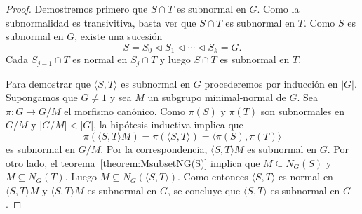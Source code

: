 \begin{proof}
	Demostremos primero que $S\cap T$ es subnormal en $G$. Como la
	subnormalidad es transivitiva, basta ver que $S\cap T$ es subnormal en $T$.
	Como $S$ es subnormal en $G$, existe una sucesión 
	\[
		S=S_0\triangleleft S_1\triangleleft \cdots\triangleleft S_k=G.
	\]
	Cada $S_{j-1}\cap T$ es normal en $S_j\cap T$ y luego $S\cap T$ es
	subnormal en $T$.
	
	
	Para demostrar que $\langle S,T\rangle$ es subnormal en $G$ 
	procederemos por inducción en $|G|$. Supongamos que $G\ne1$ y sea $M$ un
	subgrupo minimal-normal de $G$. Sea $\pi\colon G\to G/M$ el morfismo
	canónico. Como $\pi(S)$ y $\pi(T)$ son subnormales en $G/M$ y $|G/M|<|G|$,
	la hipótesis inductiva implica que 
	\[
	\pi(\langle S,T\rangle M)=\pi(\langle S,T\rangle)=\langle \pi(S),\pi(T)\rangle
	\]
	es subnormal en $G/M$. Por la correspondencia, $\langle S,T\rangle M$ es
	subnormal en $G$. Por otro lado, el teorema~\ref{theorem:MsubsetNG(S)}
	implica que $M\subseteq N_G(S)$ y $M\subseteq N_G(T)$. Luego $M\subseteq
	N_G(\langle S,T\rangle)$. Como entonces $\langle S,T\rangle$ es normal en
	$\langle S,T\rangle M$ y $\langle S,T\rangle M$ es subnormal en $G$, se
	concluye que $\langle S,T\rangle$ es subnormal en $G$.
\end{proof}


